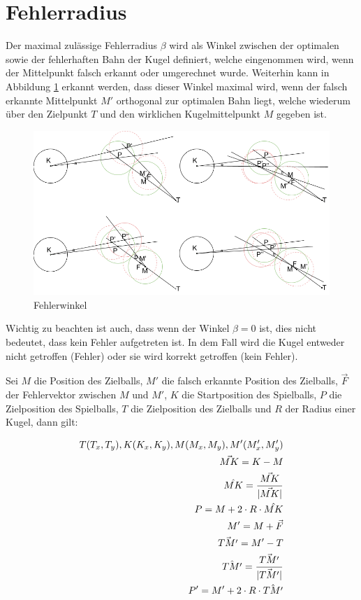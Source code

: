 \section{Fehlerradius}\label{anhang:fehler}
Der maximal zulässige Fehlerradius $\beta$ wird als Winkel zwischen der optimalen sowie der fehlerhaften Bahn
der Kugel definiert, welche eingenommen wird, wenn der Mittelpunkt falsch erkannt oder umgerechnet wurde.
Weiterhin kann in Abbildung \ref{fig:fehlerwinkel} erkannt werden, dass dieser Winkel maximal wird,
wenn der falsch erkannte Mittelpunkt $M'$ orthogonal zur optimalen Bahn liegt,
welche wiederum über den Zielpunkt $T$ und den wirklichen Kugelmittelpunkt $M$ gegeben ist.

\begin{figure}[h!]
    \begin{center}
        \includegraphics[width=0.7\linewidth]{../common/07_appendix/resources/02_fehlerwinkel.png}
    \end{center}
    \caption{Fehlerwinkel}
    \label{fig:fehlerwinkel}
\end{figure}

Wichtig zu beachten ist auch, dass wenn der Winkel $\beta = 0$ ist, dies nicht bedeutet,
dass kein Fehler aufgetreten ist. In dem Fall wird die Kugel entweder nicht getroffen (Fehler) oder sie wird korrekt
getroffen (kein Fehler).

Sei $M$ die Position des Zielballs, $M'$ die falsch erkannte Position des Zielballs, $\vec{F}$ der Fehlervektor zwischen $M$ und $M'$,
$K$ die Startposition des Spielballs, $P$ die Zielposition des Spielballs, $T$ die Zielposition des Zielballs
und $R$ der Radius einer Kugel, dann gilt:

\begin{align}
    T(T_x, T_y), K(K_x, K_y), M(M_x, M_y), M'(M_x', M_y')\\
    \vec{MK} = K - M\\
    \hat{MK} = \frac{\vec{MK}}{\lvert \vec{MK} \rvert}\\
    P = M + 2 \cdot R \cdot \hat{MK}\\
    M' = M + \vec{F}\\
    \vec{TM'} = M' - T\\
    \hat{TM'} = \frac{\vec{TM'}}{\lvert \vec{TM'} \rvert}\\
    P' = M' + 2 \cdot R \cdot \hat{TM'}\\
\end{align}


